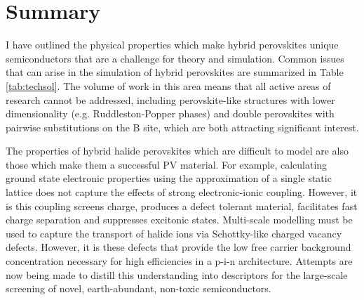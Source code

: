\section{Summary}

I have outlined the physical properties which make hybrid perovskites unique semiconductors that are a challenge for theory and simulation. 
Common issues that can arise in the simulation of hybrid perovskites are summarized in Table \ref{tab:techsol}.
%
The volume of work in this area means that all active areas of research cannot be addressed, including perovskite-like structures with lower dimensionality (e.g. Ruddleston-Popper phases)\autocite{Tsai2016,Saparov2016b,Ganose2015} and double perovskites with pairwise substitutions on the B site,\autocite{Savory2016,McClure2016a,Wei2016a,Volonakis2016} 
which are both attracting significant interest. 

The properties of hybrid halide perovskites which are difficult to model are also those which make them a successful PV material.
For example, calculating ground state electronic properties using the approximation of a single static lattice does not capture the effects of strong electronic-ionic coupling. However, it is this coupling screens charge, produces a defect tolerant material, facilitates fast charge separation and suppresses excitonic states.
Multi-scale modelling must be used to capture the transport of halide ions via Schottky-like charged vacancy defects.
However, it is these defects that provide the low free carrier background concentration necessary for high efficiencies in a p-i-n architecture.
Attempts are now being made to distill this understanding into descriptors for the large-scale screening of novel, earth-abundant, non-toxic semiconductors.\autocite{Brandt2015a,Ganose2016}


